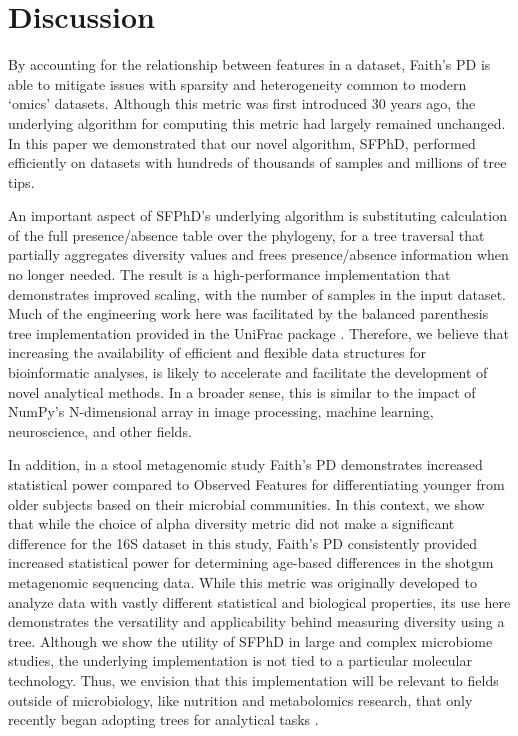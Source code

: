 \section{Discussion}
By accounting for the relationship between features in a dataset, Faith’s PD is able to mitigate issues with sparsity and heterogeneity common to modern `omics’ datasets. Although this metric was first introduced 30 years ago, the underlying algorithm for computing this metric had largely remained unchanged. In this paper we demonstrated that our novel algorithm, SFPhD, performed efficiently on datasets with hundreds of thousands of samples and millions of tree tips.

An important aspect of SFPhD’s underlying algorithm is substituting calculation of the full presence/absence table over the phylogeny, for a tree traversal that partially aggregates diversity values and frees presence/absence information when no longer needed. The result is a high-performance implementation that demonstrates improved scaling, with the number of samples in the input dataset. Much of the engineering work here was facilitated by the balanced parenthesis tree implementation provided in the UniFrac package \cite{McDonald2018-qq}. Therefore, we believe that increasing the availability of efficient and flexible data structures for bioinformatic analyses, is likely to accelerate and facilitate the development of novel analytical methods. In a broader sense, this is similar to the impact of NumPy’s \cite{McDonald2018-qq,Harris2020-vb} N-dimensional array in image processing, machine learning, neuroscience, and other fields. 

In addition, in a stool metagenomic study Faith’s PD demonstrates increased statistical power compared to Observed Features for differentiating younger from older subjects based on their microbial communities. In this context, we show that while the choice of alpha diversity metric did not make a significant difference for the 16S dataset in this study, Faith's PD consistently provided increased statistical power for determining age-based differences in the shotgun metagenomic sequencing data. While this metric was originally developed to analyze data with vastly different statistical and biological properties, its use here demonstrates the versatility and applicability behind measuring diversity using a tree. Although we show the utility of SFPhD in large and complex microbiome studies, the underlying implementation is not tied to a particular molecular technology. Thus, we envision that this implementation will be relevant to fields outside of microbiology, like nutrition and metabolomics research, that only recently began adopting trees for analytical tasks \cite{Tripathi2021-wf,Johnson2019-nx}.  

